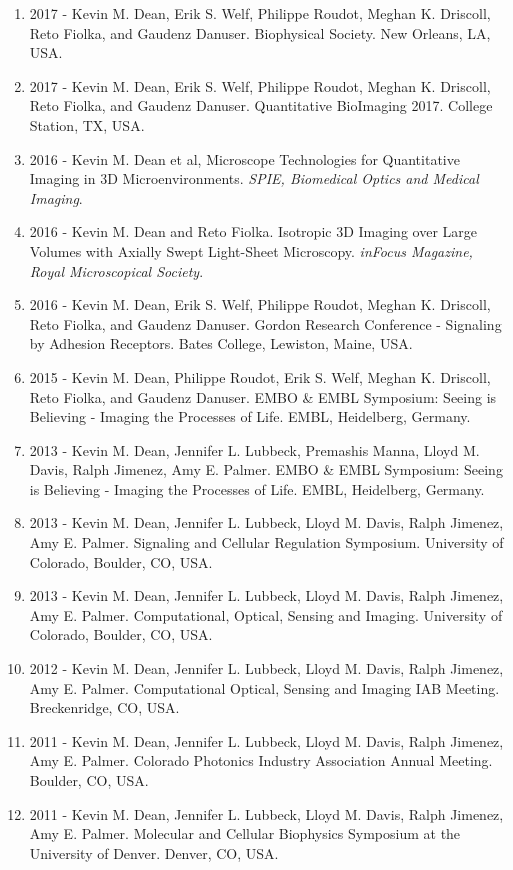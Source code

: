 \documentclass[10pt]{res}
\begin{document}
\begin{resume}
\begin{enumerate}
\item 2017 - Kevin M. Dean, Erik S. Welf, Philippe Roudot, Meghan K. Driscoll, Reto Fiolka, and Gaudenz Danuser.  Biophysical Society.  New Orleans, LA, USA. 
\item 2017 - Kevin M. Dean, Erik S. Welf, Philippe Roudot, Meghan K. Driscoll, Reto Fiolka, and Gaudenz Danuser.  Quantitative BioImaging 2017.  College Station, TX, USA. 
\item 2016 - Kevin M. Dean et al,  Microscope Technologies for Quantitative Imaging in 3D Microenvironments.  {\it SPIE, Biomedical Optics and Medical Imaging}.  
\item 2016 - Kevin M. Dean and Reto Fiolka. Isotropic 3D Imaging over Large Volumes with Axially Swept Light-Sheet Microscopy.  {\it inFocus Magazine, Royal Microscopical Society}.  
\item 2016 - Kevin M. Dean, Erik S. Welf, Philippe Roudot, Meghan K. Driscoll, Reto Fiolka, and Gaudenz Danuser.  Gordon Research Conference - Signaling by Adhesion Receptors.  Bates College, Lewiston, Maine, USA. 
\item 2015 - Kevin M. Dean, Philippe Roudot, Erik S. Welf, Meghan K. Driscoll, Reto Fiolka, and Gaudenz Danuser.  EMBO \& EMBL Symposium: Seeing is Believing - Imaging the Processes of Life.  EMBL, Heidelberg, Germany.  
\item 2013 - Kevin M. Dean, Jennifer L. Lubbeck, Premashis Manna, Lloyd M. Davis, Ralph Jimenez, Amy E. Palmer.  EMBO \& EMBL Symposium: Seeing is Believing - Imaging the Processes of Life.  EMBL, Heidelberg, Germany.
\item 2013 - Kevin M. Dean, Jennifer L. Lubbeck, Lloyd M. Davis, Ralph Jimenez, Amy E. Palmer.  Signaling and Cellular Regulation Symposium.  University of Colorado, Boulder, CO, USA.  
\item 2013 - Kevin M. Dean, Jennifer L. Lubbeck, Lloyd M. Davis, Ralph Jimenez, Amy E. Palmer.  Computational, Optical, Sensing and Imaging.  University of Colorado, Boulder, CO, USA.  
\item 2012 - Kevin M. Dean, Jennifer L. Lubbeck, Lloyd M. Davis, Ralph Jimenez, Amy E. Palmer.  Computational Optical, Sensing and Imaging IAB Meeting.  Breckenridge, CO, USA.  
\item 2011 - Kevin M. Dean, Jennifer L. Lubbeck, Lloyd M. Davis, Ralph Jimenez, Amy E. Palmer.  Colorado Photonics Industry Association Annual Meeting.  Boulder, CO, USA.    
\item 2011 - Kevin M. Dean, Jennifer L. Lubbeck, Lloyd M. Davis, Ralph Jimenez, Amy E. Palmer.  Molecular and Cellular Biophysics Symposium at the University of Denver.  Denver, CO, USA. 

\end{enumerate}
\end{resume}
\end{document}
